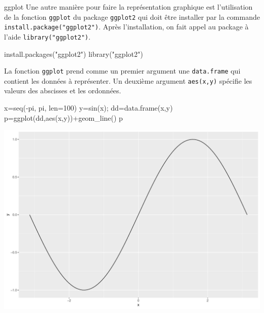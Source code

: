 \documentclass[
  8pt,
  ignorenonframetext,
]{beamer}
\newenvironment{Shaded}{\begin{snugshade}}{\end{snugshade}}
\newcommand{\AttributeTok}[1]{\textcolor[rgb]{0.77,0.63,0.00}{#1}}
\newcommand{\DecValTok}[1]{\textcolor[rgb]{0.00,0.00,0.81}{#1}}
\newcommand{\FunctionTok}[1]{\textcolor[rgb]{0.00,0.00,0.00}{#1}}
\newcommand{\NormalTok}[1]{#1}
\newcommand{\OtherTok}[1]{\textcolor[rgb]{0.56,0.35,0.01}{#1}}
\newcommand{\SpecialCharTok}[1]{\textcolor[rgb]{0.00,0.00,0.00}{#1}}
\newcommand{\StringTok}[1]{\textcolor[rgb]{0.31,0.60,0.02}{#1}}
\begin{document}
\begin{frame}[fragile]{ggplot}
\protect\hypertarget{ggplot}{}
Une autre manière pour faire la représentation graphique est
l'utilisation de la fonction \texttt{ggplot} du package \texttt{ggplot2}
qui doit être installer par la commande
\texttt{install.package("ggplot2")}. Après l'installation, on fait appel
au package à l'aide \texttt{library("ggplot2")}.

\begin{Shaded}
\begin{Highlighting}[]
\FunctionTok{install.packages}\NormalTok{(}\StringTok{"ggplot2"}\NormalTok{)}
\FunctionTok{library}\NormalTok{(}\StringTok{"ggplot2"}\NormalTok{)}
\end{Highlighting}
\end{Shaded}

\pause

La fonction \texttt{ggplot} prend comme un premier argument une
\texttt{data.frame} qui contient les données à représenter. Un deuxième
argument \texttt{aes(x,y)} spécifie les valeurs des abscisses et les
ordonnées.
\end{frame}

\begin{frame}[fragile]
\begin{Shaded}
\begin{Highlighting}[]
\NormalTok{x}\OtherTok{=}\FunctionTok{seq}\NormalTok{(}\SpecialCharTok{{-}}\NormalTok{pi, pi, }\AttributeTok{len=}\DecValTok{100}\NormalTok{)}
\NormalTok{y}\OtherTok{=}\FunctionTok{sin}\NormalTok{(x); dd}\OtherTok{=}\FunctionTok{data.frame}\NormalTok{(x,y)}
\NormalTok{p}\OtherTok{=}\FunctionTok{ggplot}\NormalTok{(dd,}\FunctionTok{aes}\NormalTok{(x,y))}\SpecialCharTok{+}\FunctionTok{geom\_line}\NormalTok{()}
\NormalTok{p}
\end{Highlighting}
\end{Shaded}

\begin{center}\includegraphics[height=0.7\textheight]{Chap2_R_files/figure-beamer/unnamed-chunk-10-1} \end{center}
\end{frame}
\end{document}
